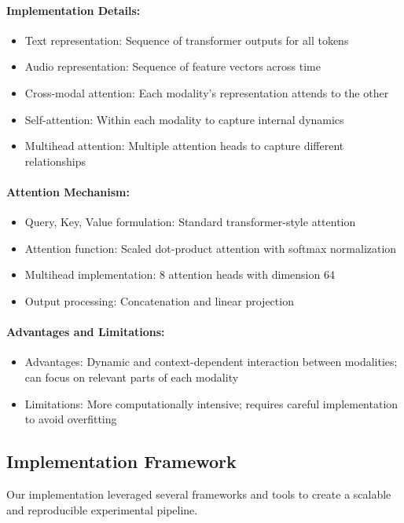 \documentclass[12pt]{article}
\begin{document}
\paragraph{Implementation Details:}
\begin{itemize}
    \item Text representation: Sequence of transformer outputs for all tokens
    \item Audio representation: Sequence of feature vectors across time
    \item Cross-modal attention: Each modality's representation attends to the other
    \item Self-attention: Within each modality to capture internal dynamics
    \item Multihead attention: Multiple attention heads to capture different relationships
\end{itemize}

\paragraph{Attention Mechanism:}
\begin{itemize}
    \item Query, Key, Value formulation: Standard transformer-style attention
    \item Attention function: Scaled dot-product attention with softmax normalization
    \item Multihead implementation: 8 attention heads with dimension 64
    \item Output processing: Concatenation and linear projection
\end{itemize}

\paragraph{Advantages and Limitations:}
\begin{itemize}
    \item Advantages: Dynamic and context-dependent interaction between modalities; can focus on relevant parts of each modality
    \item Limitations: More computationally intensive; requires careful implementation to avoid overfitting
\end{itemize}

\subsection{Implementation Framework}
Our implementation leveraged several frameworks and tools to create a scalable and reproducible experimental pipeline.
\end{document}

